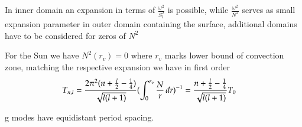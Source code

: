 \documentclass[oneside,12pt]{memoir}
\begin{document}
In inner domain an expansion in terms of $\frac{\omega^2}{S_l^2}$ is possible, while $\frac{\omega^2}{N^2}$ serves as small expansion parameter in outer domain containing the surface, additional domains have to be considered for zeros of $N^2$

For the Sun we have $N^2(r_v)=0$ where $r_v$ marks lower bound of convection zone, matching the respective expansion we have in first order
\begin{align*}
&T_{n,l}=\frac{2\pi^2(n+\frac{l}{2}-\frac{1}{4})}{\sqrt{l(l+1)}}(\int_0^{r_v}\frac{N}{r}\,dr)^{-1}=\frac{n+\frac{l}{2}-\frac{1}{4}}{\sqrt{l(l+1)}}T_0
\end{align*}

g modes have equidistant period spacing.



\begin{comment}

\chapter{Regioni di propagazione: cavit\'a risonanti.}\label{chap:propagationr}



\section{Regioni di propagazione: cavit\'a risonanti.} %

Nel Sole sono presenti regioni in cui un'onda di data frequenza si pu\'o propagare limitate da regioni in cui non si ha propagazione. Abbiamo due tipi di  la variazione delle condizioni del gas determina 

\'E possibile analizzare tramite metodo  JWKB il sistema di equazioni delle oscillazioni del secondo ordine in approssimazione di Cowling, previa oppurtuna trasformazione, da cui si ottiene la relazione
\begin{equation}\label{eq:jwkb}
\omega\int_{r_1}^{r_2}[1-\frac{\omega_A^2}{\omega^2}-\frac{S_l^2}{\omega^2}(1-\frac{N^2}{\omega^2})]\expy{\frac{1}{2}}\frac{dr}{c}\approx\pi(n-\frac{1}{2})
\end{equation}
dove $r_1$ e $r_2$ sono due zeri consecutivi del numero d'onda radiale e l'integrazione \'e in una regione di propagazione.

Nel caso dei modi p e assumendo $S_l\ll\omega$ vicino al punto di inversione superiore ho


\end{comment}
\end{document}
